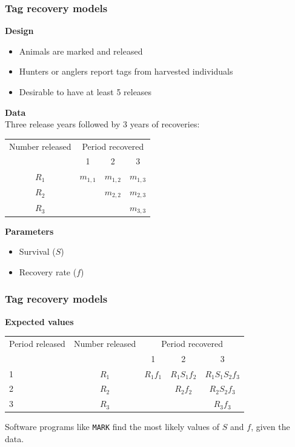 \documentclass[color=usenames,dvipsnames]{beamer}\usepackage[]{graphicx}\usepackage[]{color}
\begin{document}
\begin{frame}
  \frametitle{Tag recovery models}
  {\bf Design}
  \begin{itemize} \small
    \item Animals are marked and released
    \item Hunters or anglers report tags from harvested individuals
    \item Desirable to have at least 5 releases
  \end{itemize}
  \pause
  \vfill
  {\bf Data}                                                 \\
  {\small Three release years followed by 3 years of recoveries:}
  \begin{center}
    \small
    \begin{tabular}{cccc}
      \hline
      Number released & \multicolumn{3}{c}{Period recovered} \\
      \cline{2-4}
                      & 1         & 2         & 3            \\
      \hline
      $R_1$           & $m_{1,1}$ & $m_{1,2}$ & $m_{1,3}$      \\
      $R_2$           &           & $m_{2,2}$ & $m_{2,3}$      \\
      $R_3$           &           &           & $m_{3,3}$      \\
      \hline
    \end{tabular}
  \end{center}
  \pause
  \vfill
  {\bf Parameters}                                           \\
  \begin{itemize} \small
    \item Survival ($S$)
    \item Recovery rate ($f$)
  \end{itemize}
\end{frame}


\begin{frame}
  \frametitle{Tag recovery models}
  {\bf Expected values}
  \begin{center}
    \begin{tabular}{lcccc}
      \hline
      Period released & Number released & \multicolumn{3}{c}{Period recovered} \\
      \cline{3-5}
                    &  & 1 & 2 & 3 \\
      \hline
      1 & $R_1$ & $R_1f_1$ & $R_1S_1f_2$ & $R_1S_1S_2f_3$ \\
      2 & $R_2$ &          & $R_2f_2$ & $R_2S_2f_3$ \\
      3 & $R_3$ &          &          & $R_3f_3$ \\
      \hline
    \end{tabular}
  \end{center}
  \pause
  \vfill
  \centering
  Software programs like {\tt MARK} find the most likely values of $S$
  and $f$, given the data. \\
\end{frame}
\end{document}
